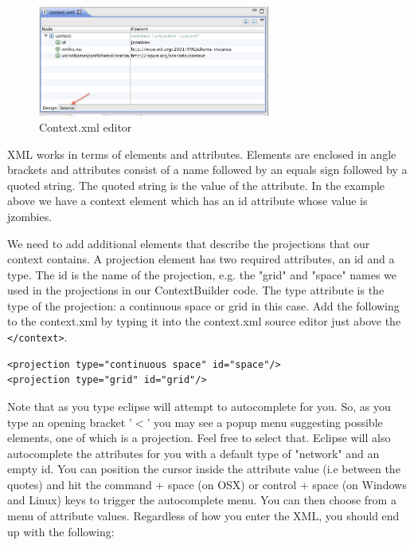 \documentclass[11pt]{amsart}
\begin{document}
\begin{figure}[h]
\begin{center}
\vspace{.2in}
\centerline {
\includegraphics[width=3in]{GettingStartedImages/cedit.png}
}
\caption{Context.xml editor}
\label{fig:cedit}
\end{center}
\end{figure}

XML works in terms of elements and attributes. Elements are enclosed in angle brackets and attributes consist of a name followed by an equals sign followed by a quoted string. The quoted string is the value of the attribute. In the example above we have a context element which has an id attribute whose value is jzombies. 

We need to add additional elements that describe the projections that our context contains.  A projection element has two required attributes, an id and a type. The id is the name of the projection, e.g. the "grid" and "space" names we used in the projections in our ContextBuilder code. The type attribute is the type of the projection: a continuous space or grid in this case. Add the following to the context.xml by typing it into the context.xml source editor just above the \texttt{</context>}.

\noindent\begin{minipage}[h]{\textwidth}
\vspace{.2in}
\lstset{language=java,caption=context.xml 2 }
\begin{lstlisting}
<projection type="continuous space" id="space"/>
<projection type="grid" id="grid"/>

\end{lstlisting}
\vspace{.2in}
\end{minipage}
Note that as you type eclipse will attempt to autocomplete for you. So, as you type an opening bracket '$<$' you may see a popup menu suggesting  possible elements, one of which is a projection. Feel free to select that. Eclipse will also autocomplete the attributes for you with a default type of "network" and an empty id. You can position the cursor inside the attribute value (i.e between the quotes) and hit the command + space (on OSX) or control + space (on Windows and Linux) keys to trigger the autocomplete menu. You can then choose from a menu of attribute values. Regardless of how you enter the XML, you should end up with the following:
\end{document}
